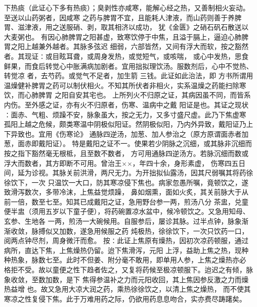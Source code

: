 \documentclass[a4paper,12pt,UTF8,twoside]{ctexbook}
\begin{document}
下热痰（此证心下多有热痰）；臭剥性亦咸寒，能解心经之热，又善制相火妄动。至送以山药粥者，因咸寒 
之药与脾胃不宜，且能耗人津液，而山药则善于养脾胃、滋津液，用之送服硝、剥，取其相济以成功， 
犹《金匮》之硝石矾石散送以大麦粥也。 
有因心肺脾胃之阳甚虚，致寒饮停于中焦，且溢于膈上，逼迫心肺脾胃之阳上越兼外越者。其脉多弦迟 
细弱，六部皆然，又间有浮大而软，按之豁然者。其现证∶或目眩耳聋，或周身发热，或觉短气，或咳喘， 
或心中发热，思食鲜果，而食后转觉心中胀满病加剧者。宜用拙拟理饮汤。服数剂后，心中不觉热、转觉凉 
者，去芍药。或觉气不足者，加生箭 三钱。此证如此治法，即 
方书所谓用温燥健补脾胃之药可以制伏相火。不知其所伏者非相火，实系温燥之药能扫除寒饮，而心肺脾胃 
之阳自安其宅也。 
上所列火不归原之证，其病因虽不同，而皆系内伤。至外感之证，亦有火不归原者，伤寒、温病中之戴 
阳证是也。其证之现状∶面赤、气粗、烦躁不安，脉象虽大，按之无力，又多寸盛尺虚。此乃下焦虚寒 
孤阳上越之危候，颇类寒温中阴极似阳证。然阴极似阳，乃内外异致，戴阳证乃上下异致也。宜用《伤寒论》 
通脉四逆汤，加葱、加人参治之（原方原谓面赤者加葱，面赤即戴阳证）。 
特是戴阳之证不一。使果若少阴脉之沉细，或其脉非沉细而按之指下豁然毫无根柢，且至数不数者， 
方可用通脉四逆汤方。若脉沉细而数或浮大而数者，其方即断不可用。曾治王××，年四十余，身形素虚， 
伤寒四五日间，延为诊视。其脉关前洪滑，两尺无力。为开拙拟仙露汤，因其尺弱嘱其将药徐徐饮下，一次 
只温饮一大口，防其寒凉侵下焦也。病家忽愚所嘱，竟顿饮之，遂致滑泻数次，多带冷沫，上焦益觉烦躁， 
鼻如烟熏，面如火炙，其关前脉大于从前一倍，数至七至。知其已成戴阳之证，急用野台参一两，煎汤八分 
茶盅，兑童便半盅（须用五岁以下童子便），将药碗置凉水盆中，候冷顿饮之。又急用知母、玄参、生地各 
一两，煎汤一大碗候用。自服参后，屡诊其脉。过半点钟，脉象渐渐收敛，脉搏似又加数，遂急用候服之药 
炖极热，徐徐饮下，一次只饮药一口，阅两点钟尽剂，周身微汗而愈。 
按∶此证上焦原有燥热，因初次凉药顿服，通过病所，直达下焦，上焦燥热仍留。迨下焦滑泻，元阳 
上浮，益助上焦之热，现种种热象，脉数七至。此时不但姜、附分毫不敢用，即单用人参，上焦之燥热亦必 
格拒不受。故以童便之性下趋者佐之，又复将药候至极凉顿服下。迨迟之有倾，脉象收敛，至数加数，是下 
焦得参温补之力而元阳收回，其上焦因参反激之力而燥热益增 
也。故又急用大凉大润之药，乘热徐徐饮之，以清上焦之燥热， 
而不使其寒凉之性复侵下焦。此于万难用药之际，仍欲用药息息吻合，实亦费尽踌躇矣。 
\end{document}
